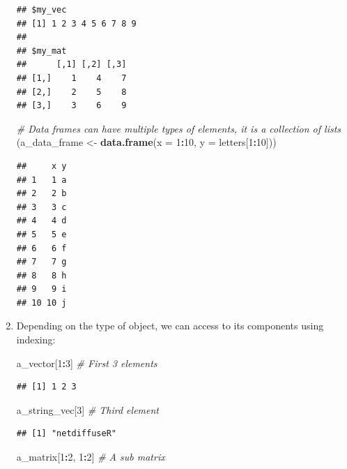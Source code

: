 \documentclass[
]{book}
\newenvironment{Shaded}{\begin{snugshade}}{\end{snugshade}}
\newcommand{\AttributeTok}[1]{\textcolor[rgb]{0.13,0.29,0.53}{#1}}
\newcommand{\CommentTok}[1]{\textcolor[rgb]{0.56,0.35,0.01}{\textit{#1}}}
\newcommand{\DecValTok}[1]{\textcolor[rgb]{0.00,0.00,0.81}{#1}}
\newcommand{\FunctionTok}[1]{\textcolor[rgb]{0.13,0.29,0.53}{\textbf{#1}}}
\newcommand{\NormalTok}[1]{#1}
\newcommand{\OtherTok}[1]{\textcolor[rgb]{0.56,0.35,0.01}{#1}}
\newcommand{\SpecialCharTok}[1]{\textcolor[rgb]{0.81,0.36,0.00}{\textbf{#1}}}
\begin{document}
\begin{enumerate}
\begin{verbatim}
## $my_vec
## [1] 1 2 3 4 5 6 7 8 9
## 
## $my_mat
##      [,1] [,2] [,3]
## [1,]    1    4    7
## [2,]    2    5    8
## [3,]    3    6    9
\end{verbatim}

\begin{Shaded}
\begin{Highlighting}[]
\CommentTok{\# Data frames can have multiple types of elements, it is a collection of lists}
\NormalTok{(a\_data\_frame }\OtherTok{\textless{}{-}} \FunctionTok{data.frame}\NormalTok{(}\AttributeTok{x =} \DecValTok{1}\SpecialCharTok{:}\DecValTok{10}\NormalTok{, }\AttributeTok{y =}\NormalTok{ letters[}\DecValTok{1}\SpecialCharTok{:}\DecValTok{10}\NormalTok{]))}
\end{Highlighting}
\end{Shaded}

\begin{verbatim}
##     x y
## 1   1 a
## 2   2 b
## 3   3 c
## 4   4 d
## 5   5 e
## 6   6 f
## 7   7 g
## 8   8 h
## 9   9 i
## 10 10 j
\end{verbatim}
\item
  Depending on the type of object, we can access to its components using indexing:

\begin{Shaded}
\begin{Highlighting}[]
\NormalTok{a\_vector[}\DecValTok{1}\SpecialCharTok{:}\DecValTok{3}\NormalTok{] }\CommentTok{\# First 3 elements}
\end{Highlighting}
\end{Shaded}

\begin{verbatim}
## [1] 1 2 3
\end{verbatim}

\begin{Shaded}
\begin{Highlighting}[]
\NormalTok{a\_string\_vec[}\DecValTok{3}\NormalTok{] }\CommentTok{\# Third element}
\end{Highlighting}
\end{Shaded}

\begin{verbatim}
## [1] "netdiffuseR"
\end{verbatim}

\begin{Shaded}
\begin{Highlighting}[]
\NormalTok{a\_matrix[}\DecValTok{1}\SpecialCharTok{:}\DecValTok{2}\NormalTok{, }\DecValTok{1}\SpecialCharTok{:}\DecValTok{2}\NormalTok{] }\CommentTok{\# A sub matrix}
\end{Highlighting}
\end{Shaded}


\end{enumerate}
\end{document}
